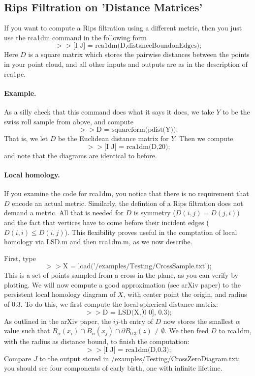 \documentclass[a4paper,10pt]{article}
\begin{document}
\subsection{Rips Filtration on 'Distance Matrices'}

If you want to compute a Rips filtration using a different metric, then you just use the rca1dm command
in the following form
$$ >> \mbox {[I J] = rca1dm(D,distanceBoundonEdges);}$$
Here $D$ is a square matrix which stores the pairwise distances between the points in your point cloud,
and all other inputs and outputs are as in the description of rca1pc.

\paragraph{Example.}

As a silly check that this command does what it says it does, we take $Y$ to be the swiss roll sample
from above, and compute
$$>> \mbox{D = squareform(pdist(Y));}$$
That is, we let $D$ be the Euclidean distance matrix for $Y$.
Then we compute
$$ >> \mbox {[I J] = rca1dm(D,20);}$$
and note that the diagrams are identical to before.

\paragraph{Local homology.}

If you examine the code for rca1dm, you notice that there is no requirement that $D$ encode an actual metric.
Similarly, the defintion of a Rips filtration does not demand a metric.
All that is needed for $D$ is symmetry ($D(i,j) = D(j,i))$ and 
the fact that vertices have to come before their incident edges ($D(i,i) \leq D(i,j)$).
This flexibility proves useful in the comptation of local homology via LSD.m and then rca1dm.m, as we now describe.

First, type
$$ >> \mbox{X = load('/examples/Testing/CrossSample.txt');}$$
This is a set of points sampled from a cross in the plane, as you can verify by plotting.
We will now compute a good approximation (see arXiv paper) to the persistent local homology
diagram of $X$, with center point the origin, and radius of $0.3$.
To do this, we first compute the local spherical distance matrix:
$$ >> \mbox{D = LSD(X,[0 0], 0.3);}$$
As outlined in the arXiv paper, the $ij$-th entry of $D$ now stores the smallest $\alpha$ value
such that $B_{\alpha}(x_i) \cap B_{\alpha}(x_j) \cap \partial B_{0.3}(z) \neq \emptyset.$
We then feed $D$ to rca1dm, with the radius as distance bound, to finish the computation:
$$  >> \mbox{[I J] = rca1dm(D,0.3);}$$
Compare $J$ to the output stored in /examples/Testing/CrossZeroDiagram.txt; you should see four components of early birth, one with infinite lifetime.
\end{document}
